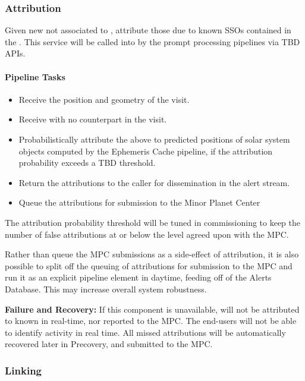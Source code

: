 \subsubsection{Attribution}

Given new \DIASources not associated to \DIAObjects, attribute those due to known SSOs contained in the \MPCORB. This service will be called into by the prompt processing pipelines via TBD APIs.

\paragraph{Pipeline Tasks}

\begin{itemize}
	\item Receive the position and geometry of the visit.
	\item Receive \DIASources with no \DIAObject counterpart in the visit.
	\item Probabilistically attribute the \DIASources above to predicted positions of solar system objects computed by the Ephemeris Cache pipeline, if the attribution probability exceeds a TBD threshold.
	\item Return the attributions to the caller for dissemination in the alert stream.
	\item Queue the attributions for submission to the Minor Planet Center
\end{itemize}

The attribution probability threshold will be tuned in commissioning to keep the number of false attributions at or below the level agreed upon with the MPC.

Rather than queue the MPC submissions as a side-effect of attribution, it is also possible to split off the queuing of attributions for submission to the MPC and run it as an explicit pipeline element in daytime, feeding off of the Alerts Database. This may increase overall system robustness.

{\bf Failure and Recovery:} If this component is unavailable, \DIASources will not be attributed to known \SSObjects in real-time, nor reported to the MPC. The end-users will not be able to identify \SSObject activity in real time. All missed attributions will be automatically recovered later in Precovery, and submitted to the MPC.

\subsubsection{Linking}

